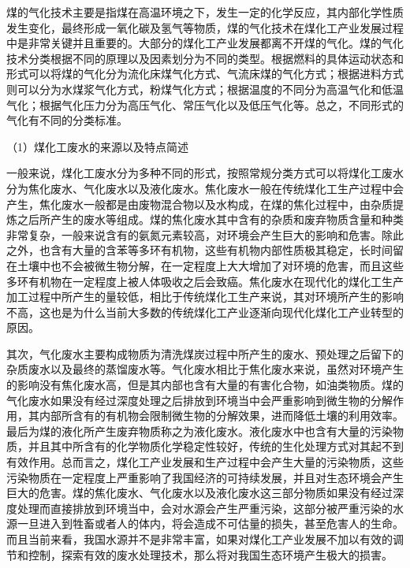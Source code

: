 \par 煤的气化技术主要是指煤在高温环境之下，发生一定的化学反应，其内部化学性质发生变化，最终形成一氧化碳及氢气等物质，煤的气化技术在煤化工产业发展过程中是非常关键并且重要的。大部分的煤化工产业发展都离不开煤的气化。煤的气化技术分类根据不同的原理以及因素划分为不同的类型。\cite{huanghuijun_2016}根据燃料的具体运动状态和形式可以将煤的气化分为流化床煤气化方式、气流床煤的气化方式；根据进料方式则可以分为水煤浆气化方式，粉煤气化方式；根据温度的不同分为高温气化和低温气化；根据气化压力分为高压气化、常压气化以及低压气化等。总之，不同形式的气化有不同的分类标准。\par

（1）煤化工废水的来源以及特点简述\par
一般来说，煤化工废水分为多种不同的形式，按照常规分类方式可以将煤化工废水分为焦化废水、气化废水以及液化废水。焦化废水一般在传统煤化工生产过程中会产生，焦化废水一般都是由废物混合物以及水构成，在煤的焦化过程中，由杂质提炼之后所产生的废水等组成。煤的焦化废水其中含有的杂质和废弃物质含量和种类非常复杂，一般来说含有的氨氮元素较高，对环境会产生巨大的影响和危害。\cite{luming_2016}除此之外，也含有大量的含苯等多环有机物，这些有机物内部性质极其稳定，长时间留在土壤中也不会被微生物分解，在一定程度上大大增加了对环境的危害，而且这些多环有机物在一定程度上被人体吸收之后会致癌。焦化废水在现代化的煤化工生产加工过程中所产生的量较低，相比于传统煤化工生产来说，其对环境所产生的影响不高，这也是为什么当前大多数的传统煤化工产业逐渐向现代化煤化工产业转型的原因。\par
其次，气化废水主要构成物质为清洗煤炭过程中所产生的废水、预处理之后留下的杂质废水以及最终的蒸馏废水等。气化废水相比于焦化废水来说，虽然对环境产生的影响没有焦化废水高，但是其内部也含有大量的有害化合物，如油类物质。煤的气化废水如果没有经过深度处理之后排放到环境当中会严重影响到微生物的分解作用，其内部所含有的有机物会限制微生物的分解效果，进而降低土壤的利用效率。最后为煤的液化所产生废弃物质称之为液化废水。液化废水中也含有大量的污染物质，并且其中所含有的化学物质化学稳定性较好，传统的生化处理方式对其起不到有效作用。总而言之，煤化工产业发展和生产过程中会产生大量的污染物质，这些污染物质在一定程度上严重影响了我国经济的可持续发展，并且对生态环境会产生巨大的危害。煤的焦化废水、气化废水以及液化废水这三部分物质如果没有经过深度处理而直接排放到环境当中，会对水源会产生严重污染，这部分被严重污染的水源一旦进入到牲畜或者人的体内，将会造成不可估量的损失，甚至危害人的生命。而且当前来看，我国水源并不是非常丰富，如果对煤化工产业发展不加以有效的调节和控制，探索有效的废水处理技术，那么将对我国生态环境产生极大的损害。\cite{rongjunfeng_2015}\par

